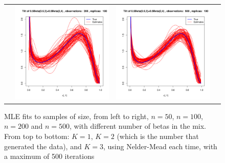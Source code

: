 \documentclass[10pt]{report}
\begin{document}
\begin{figure}[h]
\begin{tabular}{cccc}
	&
	\includegraphics[width=\textwidth/4]{../img/p05_a05_b3_p05_a2_b4/tilted/K3/densities/n200_R100.pdf}
	&
	\includegraphics[width=\textwidth/4]{../img/p05_a05_b3_p05_a2_b4/tilted/K3/densities/n500_R100.pdf}\\
	
\end{tabular}
\label{fig:TDB1}
\caption{MLE fits to samples of size, from left to right, $n=50$, $n=100$, $n=200$ and $n=500$, with different number of betas in the mix. From top to bottom: $K=1$, $K=2$ (which is the number that generated the data), and $K=3$, using Nelder-Mead each time, with a maximum of 500 iterations}
\end{figure}
\end{document}
